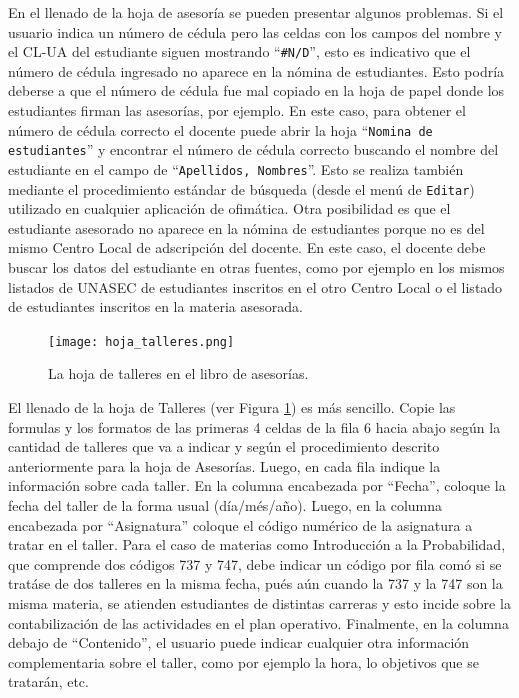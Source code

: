 \documentclass[letterpaper,12pt]{book}
\begin{document}
En el llenado de la hoja de asesoría se pueden presentar algunos problemas. Si el usuario indica un número de cédula pero las celdas con los campos del nombre y el CL-UA del estudiante siguen mostrando ``\texttt{\#N/D}'', esto es indicativo que el número de cédula ingresado no aparece en la nómina de estudiantes. Esto podría deberse a que el número de cédula fue mal copiado en la hoja de papel donde los estudiantes firman las asesorías, por ejemplo.  En este caso, para obtener el número de cédula correcto el docente puede abrir la hoja ``\texttt{Nomina de estudiantes}'' y encontrar el número de cédula correcto buscando el nombre del estudiante en el campo de ``\texttt{Apellidos, Nombres}''.  Esto se realiza también mediante el procedimiento estándar de búsqueda (desde el menú de \texttt{Editar}) utilizado en cualquier aplicación de ofimática.  Otra posibilidad es que el estudiante asesorado no aparece en la nómina de estudiantes porque no es del mismo Centro Local de adscripción del docente. En este caso, el docente debe buscar los datos del estudiante en otras fuentes, como por ejemplo en los mismos listados de UNASEC de estudiantes inscritos en el otro Centro Local o el listado de estudiantes inscritos en la materia asesorada.

\begin{figure}[!ht]
  \centering
  \texttt{[image: hoja\_talleres.png]}
  \caption{La hoja de talleres en el libro de asesorías.}
  \label{fig:hoja_talleres}
\end{figure}

El llenado de la hoja de Talleres (ver Figura \ref{fig:hoja_talleres}) es más sencillo. Copie las formulas y los formatos de las primeras 4 celdas de la fila 6 hacia abajo según la cantidad de talleres que va a indicar y según el procedimiento descrito anteriormente para la hoja de Asesorías. Luego, en cada fila indique la información sobre cada taller. En la columna encabezada por ``Fecha'', coloque la fecha del taller de la forma usual (día/més/año). Luego, en la columna encabezada por ``Asignatura'' coloque el código numérico de la asignatura a tratar en el taller. Para el caso de materias como Introducción a la Probabilidad, que comprende dos códigos 737 y 747, debe indicar un código por fila comó si se tratáse de dos talleres en la misma fecha, pués aún cuando la 737 y la 747 son la misma materia, se atienden estudiantes de distintas carreras y esto incide sobre la contabilización de las actividades en el plan operativo. Finalmente, en la columna debajo de ``Contenido'', el usuario puede indicar cualquier otra información complementaria sobre el taller, como por ejemplo la hora, lo objetivos que se tratarán, etc.
\end{document}
